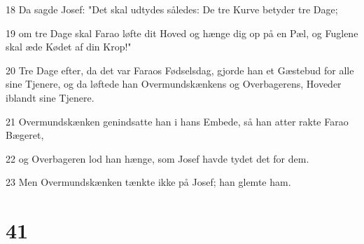 \par 18 Da sagde Josef: "Det skal udtydes således: De tre Kurve betyder tre Dage;
\par 19 om tre Dage skal Farao løfte dit Hoved og hænge dig op på en Pæl, og Fuglene skal æde Kødet af din Krop!"
\par 20 Tre Dage efter, da det var Faraos Fødselsdag, gjorde han et Gæstebud for alle sine Tjenere, og da løftede han Overmundskænkens og Overbagerens, Hoveder iblandt sine Tjenere.
\par 21 Overmundskænken genindsatte han i hans Embede, så han atter rakte Farao Bægeret,
\par 22 og Overbageren lod han hænge, som Josef havde tydet det for dem.
\par 23 Men Overmundskænken tænkte ikke på Josef; han glemte ham.

\chapter{41}

